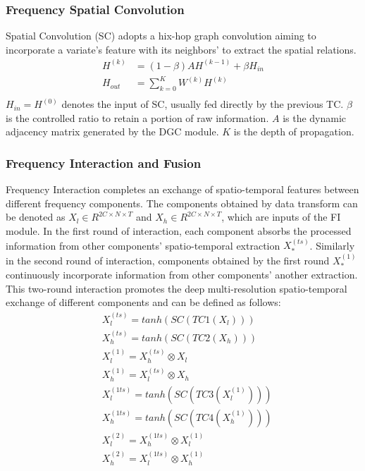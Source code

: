 \documentclass[final,12pt]{elsarticle}
\begin{document}
\subsubsection{Frequency Spatial Convolution}
\label{subsubsec-4.4.2}


Spatial Convolution (SC) adopts a hix-hop graph convolution 
aiming to incorporate a variate's feature with its neighbors' 
to extract the spatial relations.  %
\begin{equation}
  \begin{aligned}
    H^{(k)} &= (1 - \beta) A H^{(k-1)} + \beta H_{in}  \\
    H_{out} &= \sum_{k=0}^{K} W^{(k)} H^{(k)}  \\
  \end{aligned}
\end{equation}  %
$H_{in} = H^{(0)}$ denotes the input of SC, 
usually fed directly by the previous TC.
$\beta$ is the controlled ratio 
to retain a portion of raw information.
$A$ is the dynamic adjacency matrix generated by the DGC module.
$K$ is the depth of propagation.


\subsubsection{Frequency Interaction and Fusion}
\label{subsubsec-4.4.3}


Frequency Interaction completes an exchange of spatio-temporal features 
between different frequency components.  %
The components obtained by data transform can be denoted as 
$X_{l} \in R^{2C \times N \times T}$ and 
$X_{h} \in R^{2C \times N \times T}$, 
which are inputs of the FI module.  %
In the first round of interaction, 
each component absorbs the processed information 
from other components' spatio-temporal extraction $X_{*}^{(ts)}$.  %
Similarly in the second round of interaction, 
components obtained by the first round $X_{*}^{(1)}$ 
continuously incorporate information 
from other components' another extraction.  %
This two-round interaction promotes 
the deep multi-resolution spatio-temporal exchange 
of different components and can be defined as follows: 
\begin{equation}
  \begin{aligned}
    & X_{l}^{(ts)}  = tanh(SC(TC1(X_{l})))  \\
    & X_{h}^{(ts)}  = tanh(SC(TC2(X_{h})))  \\
    & X_{l}^{(1)}   = X_{h}^{(ts)} \otimes X_{l}  \\
    & X_{h}^{(1)}   = X_{l}^{(ts)} \otimes X_{h}  \\
    & X_{l}^{(1ts)} = tanh(SC(TC3(X_{l}^{(1)})))  \\
    & X_{h}^{(1ts)} = tanh(SC(TC4(X_{h}^{(1)})))  \\
    & X_{l}^{(2)}   = X_{h}^{(1ts)} \otimes X_{l}^{(1)}  \\
    & X_{h}^{(2)}   = X_{l}^{(1ts)} \otimes X_{h}^{(1)}  \\
  \end{aligned}
\end{equation}  %
\end{document}
